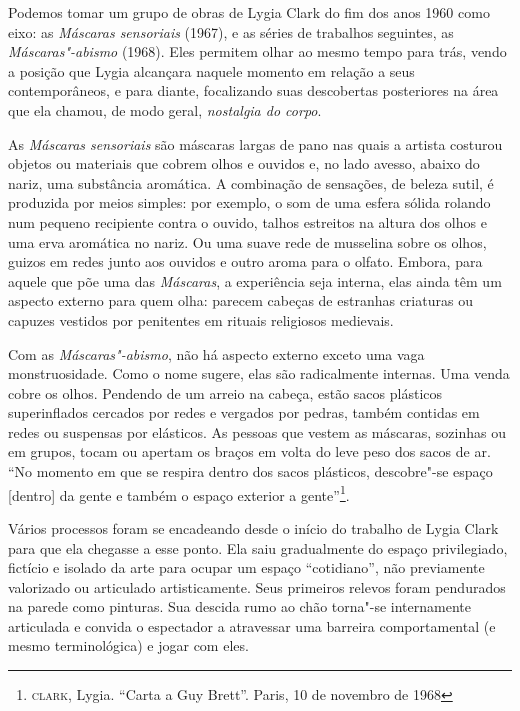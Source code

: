 \hfill{}
\bigskip
\bigskip
\bigskip

\begin{multicols}{2}

\noindent{}Podemos tomar um grupo de obras de Lygia Clark do fim dos anos 1960 como eixo: as \textit{Máscaras sensoriais} (1967), e as séries de trabalhos seguintes, as \textit{Máscaras"-abismo} (1968). Eles permitem olhar ao mesmo tempo para trás, vendo a posição que Lygia alcançara naquele momento em relação a seus contemporâneos, e para diante, focalizando suas descobertas posteriores na área que ela chamou, de modo geral, \textit{nostalgia do corpo}.

As \textit{Máscaras sensoriais} são máscaras largas de pano nas quais a artista costurou objetos ou materiais que cobrem olhos e ouvidos e, no lado avesso, abaixo do nariz, uma substância aromática. A combinação de sensações, de beleza sutil, é produzida por meios simples: por exemplo, o som de uma esfera sólida rolando num pequeno recipiente contra o ouvido, talhos estreitos na altura dos olhos e uma erva aromática no nariz. Ou uma suave rede de musselina sobre os olhos, guizos em redes junto aos ouvidos e outro aroma para o olfato. Embora, para aquele que põe uma das \textit{Máscaras}, a experiência seja interna, elas ainda têm um aspecto externo para quem olha: parecem cabeças de estranhas criaturas ou capuzes vestidos por penitentes em rituais religiosos medievais. 

Com as \textit{Máscaras"-abismo}, não há aspecto externo exceto uma vaga monstruosidade. Como o nome sugere, elas são radicalmente internas. Uma venda cobre os olhos. Pendendo de um arreio na cabeça, estão sacos plásticos superinflados cercados por redes e vergados por pedras, também contidas em redes ou suspensas por elásticos. As pessoas que vestem as máscaras, sozinhas ou em grupos, tocam ou apertam os braços em volta do leve peso dos sacos de ar. ``No momento em que se respira dentro dos sacos plásticos, descobre"-se espaço {[}dentro{]} da gente e também o espaço exterior a gente''\footnote{\textsc{clark}, Lygia. ``Carta a Guy Brett''. Paris, 10 de novembro de 1968}.

Vários processos foram se encadeando desde o início do trabalho de Lygia
Clark para que ela chegasse a esse ponto. Ela saiu gradualmente do
espaço privilegiado, fictício e isolado da arte para ocupar um espaço
``cotidiano'', não previamente valorizado ou articulado artisticamente.
Seus primeiros relevos foram pendurados na parede como pinturas. Sua
descida rumo ao chão torna"-se internamente articulada e convida o
espectador a atravessar uma barreira comportamental (e mesmo
terminológica) e jogar com eles. 


\end{multicols}
